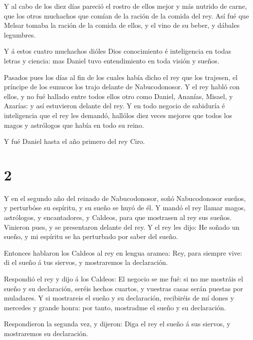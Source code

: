  Y al cabo de los diez días pareció el rostro de ellos
mejor y más nutrido de carne, que los otros muchachos que comían de la
ración de la comida del rey.  Así fué que Melsar tomaba la
ración de la comida de ellos, y el vino de su beber, y dábales
legumbres.

 Y á estos cuatro muchachos dióles Dios conocimiento é
inteligencia en todas letras y ciencia: mas Daniel tuvo entendimiento en
toda visión y sueños.

 Pasados pues los días al fin de los cuales había dicho el
rey que los trajesen, el príncipe de los eunucos los trajo delante de
Nabucodonosor.  Y el rey habló con ellos, y no fué hallado
entre todos ellos otro como Daniel, Ananías, Misael, y Azarías: y así
estuvieron delante del rey.  Y en todo negocio de sabiduría
é inteligencia que el rey les demandó, hallólos diez veces mejores que
todos los magos y astrólogos que había en todo su reino.

 Y fué Daniel hasta el año primero del rey Ciro.

\hypertarget{section-1}{%
\section{2}\label{section-1}}

 Y en el segundo año del reinado de Nabucodonosor, soñó
Nabucodonosor sueños, y perturbóse su espíritu, y su sueño se huyó de
él.  Y mandó el rey llamar magos, astrólogos, y
encantadores, y Caldeos, para que mostrasen al rey sus sueños. Vinieron
pues, y se presentaron delante del rey.  Y el rey les dijo:
He soñado un sueño, y mi espíritu se ha perturbado por saber del sueño.

 Entonces hablaron los Caldeos al rey en lengua aramea: Rey,
para siempre vive: di el sueño á tus siervos, y mostraremos la
declaración.

 Respondió el rey y dijo á los Caldeos: El negocio se me
fué: si no me mostráis el sueño y su declaración, seréis hechos cuartos,
y vuestras casas serán puestas por muladares.  Y si
mostrareis el sueño y su declaración, recibiréis de mí dones y mercedes
y grande honra: por tanto, mostradme el sueño y su declaración.

 Respondieron la segunda vez, y dijeron: Diga el rey el
sueño á sus siervos, y mostraremos su declaración.

